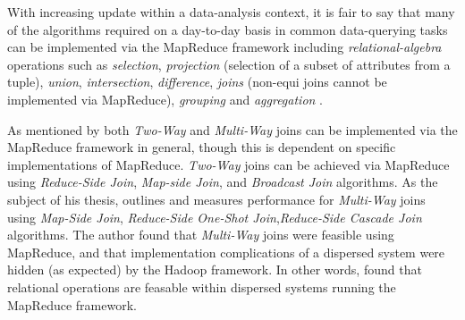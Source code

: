 With increasing update within a data-analysis context, it is fair to say that many of the algorithms required on a day-to-day basis in common data-querying tasks can be implemented via the MapReduce framework including \textit{relational-algebra} operations such as \textit{selection}, \textit{projection} (selection of a subset of attributes from a tuple), \textit{union}, \textit{intersection}, \textit{difference}, \textit{joins} (non-equi joins cannot be implemented via MapReduce), \textit{grouping} and \textit{aggregation} \cite{mining2011}.

As mentioned by \cite{chandar2010} both \textit{Two-Way} and \textit{Multi-Way} joins can be implemented via the MapReduce framework in general, though this is dependent on specific implementations of MapReduce. \textit{Two-Way} joins can be achieved via MapReduce using \textit{Reduce-Side Join}, \textit{Map-side Join}, and \textit{Broadcast Join} algorithms. As the subject of his thesis, \cite{chandar2010} outlines and measures performance for \textit{Multi-Way} joins using \textit{Map-Side Join}, \textit{Reduce-Side One-Shot Join},\textit{Reduce-Side Cascade Join} algorithms. The author found that \textit{Multi-Way} joins were feasible using MapReduce, and that implementation complications of a dispersed system were hidden (as expected) by the Hadoop framework. In other words, \cite{chandar2010} found that relational operations are feasable within dispersed systems running the MapReduce framework.